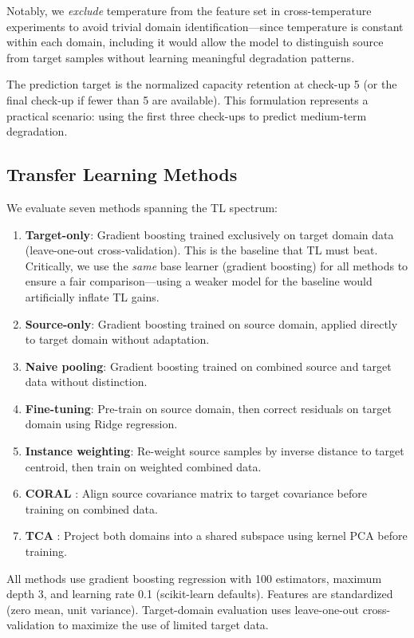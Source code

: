 \documentclass[review]{elsarticle}
\begin{document}
Notably, we \textit{exclude} temperature from the feature set in cross-temperature experiments to avoid trivial domain identification---since temperature is constant within each domain, including it would allow the model to distinguish source from target samples without learning meaningful degradation patterns.

The prediction target is the normalized capacity retention at check-up 5 (or the final check-up if fewer than 5 are available). This formulation represents a practical scenario: using the first three check-ups to predict medium-term degradation.

\subsection{Transfer Learning Methods}

We evaluate seven methods spanning the TL spectrum:

\begin{enumerate}
    \item \textbf{Target-only}: Gradient boosting trained exclusively on target domain data (leave-one-out cross-validation). This is the baseline that TL must beat. Critically, we use the \textit{same} base learner (gradient boosting) for all methods to ensure a fair comparison---using a weaker model for the baseline would artificially inflate TL gains.
    \item \textbf{Source-only}: Gradient boosting trained on source domain, applied directly to target domain without adaptation.
    \item \textbf{Naive pooling}: Gradient boosting trained on combined source and target data without distinction.
    \item \textbf{Fine-tuning}: Pre-train on source domain, then correct residuals on target domain using Ridge regression.
    \item \textbf{Instance weighting}: Re-weight source samples by inverse distance to target centroid, then train on weighted combined data.
    \item \textbf{CORAL} \cite{sun2016return}: Align source covariance matrix to target covariance before training on combined data.
    \item \textbf{TCA} \cite{pan2011domain}: Project both domains into a shared subspace using kernel PCA before training.
\end{enumerate}

All methods use gradient boosting regression with 100 estimators, maximum depth 3, and learning rate 0.1 (scikit-learn defaults). Features are standardized (zero mean, unit variance). Target-domain evaluation uses leave-one-out cross-validation to maximize the use of limited target data.
\end{document}
